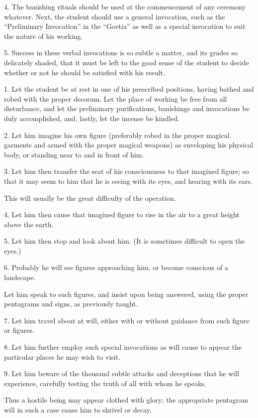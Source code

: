 4. The banishing rituals should be used at the commencement of any ceremony whatever. Next, the student should use a general invocation, such as the \enquote{Preliminary Invocation} in the \enquote{Goetia} as well as a special invocation to suit the nature of his working.

5. Success in these verbal invocations is so subtle a matter, and its grades so delicately shaded, that it must be left to the good sense of the student to decide whether or not he should be satisfied with his result.



1. Let the student be at rest in one of his prescribed positions, having bathed and robed with the proper decorum. Let the place of working be free from all disturbance, and let the preliminary purifications, banishings and invocations be duly accomplished, and, lastly, let the incense be kindled.

2. Let him imagine his own figure (preferably robed in the proper magical garments and armed with the proper magical weapons) as enveloping his physical body, or standing near to and in front of him.

3. Let him then transfer the seat of his consciousness to that imagined figure; so that it may seem to him that he is seeing with its eyes, and hearing with its ears.

This will usually be the great difficulty of the operation.

4. Let him then cause that imagined figure to rise in the air to a great height above the earth.

5. Let him then stop and look about him. (It is sometimes difficult to open the eyes.)

6. Probably he will see figures approaching him, or become conscious of a landscape.

Let him speak to such figures, and insist upon being answered, using the proper pentagrams and signs, as previously taught.

7. Let him travel about at will, either with or without guidance from such figure or figures.

8. Let him further employ such special invocations as will cause to appear the particular places he may wish to visit.

9. Let him beware of the thousand subtle attacks and deceptions that he will experience, carefully testing the truth of all with whom he speaks.

Thus a hostile being may appear clothed with glory; the appropriate pentagram will in such a case cause him to shrivel or decay.


